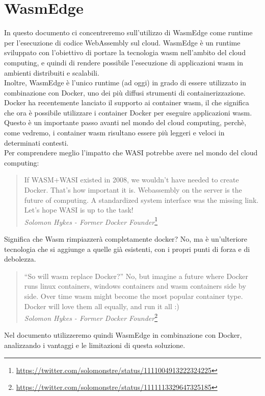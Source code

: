 \section{WasmEdge}
In questo documento ci concentreremo sull'utilizzo di WasmEdge come runtime per l'esecuzione di codice WebAssembly sul cloud. WasmEdge è un runtime sviluppato con l'obiettivo di portare la tecnologia wasm nell'ambito del cloud computing, e quindi di rendere possibile l'esecuzione di applicazioni wasm in ambienti distribuiti e scalabili.
\\
Inoltre, WasmEdge è l'unico runtime (ad oggi) in grado di essere utilizzato in combinazione con Docker, uno dei più diffusi strumenti di containerizzazione. Docker ha recentemente lanciato il supporto ai container wasm\cite{docker-wasm-tech-preview}, il che significa che ora è possibile utilizzare i container Docker per eseguire applicazioni wasm. Questo è un importante passo avanti nel mondo del cloud computing, perchè, come vedremo, i container wasm risultano essere più leggeri e veloci in determinati contesti.
\\
Per comprendere meglio l'impatto che WASI potrebbe avere nel mondo del cloud computing:
\begin{quote}
    If WASM+WASI existed in 2008, we wouldn't have needed to create Docker. That's how important it is. Webassembly on the server is the future of computing. A standardized system interface was the missing link. Let's hope WASI is up to the task!
    \\
    \textit{Solomon Hykes - Former Docker Founder}\footnote{\url{https://twitter.com/solomonstre/status/1111004913222324225}}
\end{quote}

Significa che Wasm rimpiazzerà completamente docker? No, ma è un'ulteriore tecnologia che si aggiunge a quelle già esistenti, con i propri punti di forza e di debolezza.
\begin{quote}
    “So will wasm replace Docker?” No, but imagine a future where Docker runs linux containers, windows containers and wasm containers side by side. Over time wasm might become the most popular container type. Docker will love them all equally, and run it all :)
    \\
    \textit{Solomon Hykes - Former Docker Founder}\footnote{\url{https://twitter.com/solomonstre/status/1111113329647325185}}
\end{quote}

Nel documento utilizzeremo quindi WasmEdge in combinazione con Docker, analizzando i vantaggi e le limitazioni di questa soluzione.